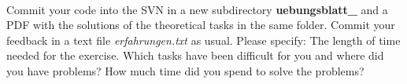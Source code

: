 \\

Commit your code into the SVN in a new subdirectory 
\textbf{uebungsblatt\_\ExerciseSheetNumber} and a PDF with the solutions of the 
theoretical tasks in the same folder. Commit your feedback in a text file 
\emph{erfahrungen.txt} as usual. Please specify: The length of time needed for 
the exercise. Which tasks have been difficult for you and where did you have 
problems? How much time did you spend to solve the problems?